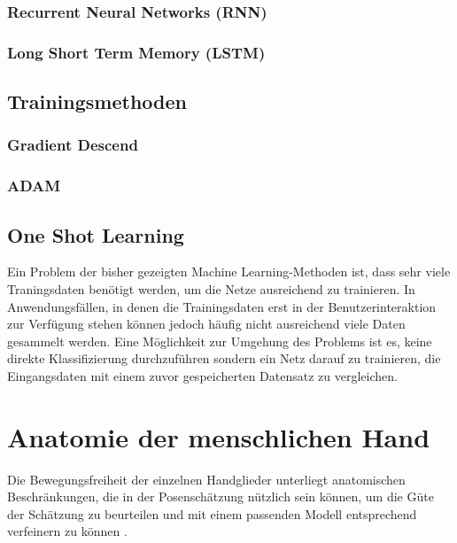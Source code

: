 		
		
		
		\subsubsection { Recurrent Neural Networks (RNN) }
		\subsubsection { Long Short Term Memory (LSTM) }
	
	\subsection { Trainingsmethoden }
		
		\subsubsection{Gradient Descend}
		\label{sec:gradient-descend}
		
		\subsubsection{ADAM}
		
	\subsection{ One Shot Learning }
	Ein Problem der bisher gezeigten Machine Learning-Methoden ist, dass sehr viele Traningsdaten benötigt werden, um die Netze ausreichend zu trainieren. In Anwendungsfällen, in denen die Trainingsdaten erst in der Benutzerinteraktion zur Verfügung stehen können jedoch häufig nicht ausreichend viele Daten gesammelt werden. Eine Möglichkeit zur Umgehung des Problems ist es, keine direkte Klassifizierung durchzuführen sondern ein Netz darauf zu trainieren, die Eingangsdaten mit einem zuvor gespeicherten Datensatz zu vergleichen. 
	
\section { Anatomie der menschlichen Hand }
	Die Bewegungsfreiheit der einzelnen Handglieder unterliegt anatomischen Beschränkungen, die in der Posenschätzung nützlich sein können, um die Güte der Schätzung zu beurteilen und mit einem passenden Modell entsprechend verfeinern zu können \cite{Melax5222017}.
	
